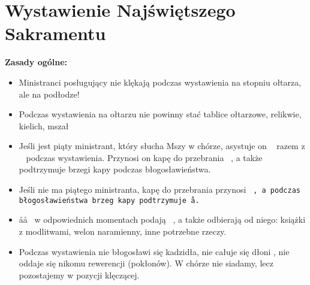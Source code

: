 \section{Wystawienie Najświętszego Sakramentu}


\textbf{Zasady ogólne:}
\begin{itemize}
	\item Ministranci posługujący nie klękają podczas wystawienia na stopniu
	      ołtarza, ale na podłodze!
	\item Podczas wystawienia na ołtarzu nie powinny stać tablice ołtarzowe,
	      relikwie, kielich, mszał
	\item Jeśli jest piąty ministrant, który słucha Mszy w chórze, asystuje on
	      \ii~ razem z \cc~ podczas wystawienia. Przynosi on kapę do przebrania
	      \ii~, a także podtrzymuje brzegi kapy podczas błogosławieństwa.
	\item Jeśli nie ma piątego ministranta, kapę do przebrania przynosi \tt~, a
	      podczas błogosławieństwa brzeg kapy podtrzymuje \aa.
	\item \aa\aa~ w odpowiednich momentach podają \cc~, a także odbierają od
	      niego: książki z modlitwami, welon naramienny, inne potrzebne rzeczy.
	\item Podczas wystawienia nie błogosławi się kadzidła, nie całuje się dłoni
	      \ii, nie oddaje się nikomu rewerencji (pokłonów). W chórze nie
	      siadamy, lecz pozostajemy w pozycji klęczącej.
\end{itemize}

